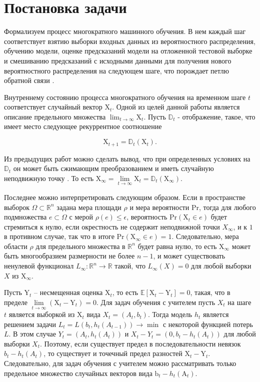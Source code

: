 \section{Постановка задачи} \label{sec:Problem_statement}

Формализуем процесс многократного машинного обучения. В нем каждый шаг соответствует взятию выборки входных данных из вероятностного распределения, обучению модели, оценке предсказаний модели на отложенной тестовой выборке и смешиванию предсказаний с исходными данными для получения нового вероятностного распределения на следующем шаге, что порождает петлю обратной связи \cite{khritankov2021existence}.

Внутреннему состоянию процесса многократного обучения на временном шаге $t$ соответствует случайный вектор $\text{X}_t$. Одной из целей данной работы является описание предельного множества $\lim_{t \to \infty} \text{X}_t$. Пусть $\mathbb{D}_t$ - отображение, такое, что имеет место следующее рекуррентное соотношение

\[
    \text{X}_{t+1} = \mathbb{D}_t (\text{X}_t).
\]

Из предыдущих работ \cite{khritankov2021hidden, khritankov2023positive} можно сделать вывод, что при определенных условиях на $\mathbb{D}_t$ он может быть сжимающим преобразованием и иметь случайную неподвижную точку \citep{itoh1977random}. То есть $\text{X}_{\infty} = \lim\limits_{t \to \infty} \text{X}_{t} = \mathbb{D}_t (\text{X}_{\infty})$. 

Последнее можно интерпретировать следующим образом. Если в пространстве выборок $\Omega \subset \mathbb{R}^n$ задана мера площади $\rho$ и мера вероятности $\text{Pr}$, тогда для любого подмножества $e \subset \Omega$ с мерой $\rho(e)\leq \epsilon$, вероятность $\text{Pr}(\text{X}_t \in e)$ будет стремиться к нулю, если окрестность не содержит неподвижной точки $X_{\infty}$, и к $1$ в противном случае, так что в итоге $\text{Pr}(\text{X}_{\infty} \in e) = 1$. Следовательно, мера области $\rho$ для предельного множества в $\mathbb{R}^n$ будет равна нулю, то есть $\text{X}_{\infty}$ может быть многообразием размерности не более $n-1$, и может существовать ненулевой функционал $L_{\infty}: \mathbb{R}^n \to \mathbb{R}$ такой, что $L_{\infty}(X) = 0$ для любой выборки $X$ из $\text{X}_\infty$.

Пусть $\text{Y}_t$ -- несмещенная оценка $\text{X}_t$, то есть $\mathbb{E}\left[\text{X}_t - \text{Y}_t\right] = 0$, такая, что в пределе $\lim\limits_{t \to \infty} \left(\text{X}_t - \text{Y}_t \right) = 0$.  Для задач обучения с учителем пусть $X_t$ на шаге $t$ является выборкой из $\text{X}_t$ вида $X_t = (A_t, b_t)$. Тогда модель $h_t$ является решением задачи $L_t = L(b_t, h_t(A_{t-1})) \to \min$ с некоторой функцией потерь $L$. В этом случае $Y_t = (A_t, h_t(A_t))$ и $X_t - Y_t = (0, b_t - h_t(A_{t}))$ для любой выборки $X_t$. Поэтому, если существует предел в последовательности невязок $b_t - h_t(A_t)$, то существует и точечный предел разностей $\text{X}_t - \text{Y}_t$. Следовательно, для задач обучения с учителем можно рассматривать только предельное множество случайных векторов вида $\text{b}_t - h_t(\text{A}_t)$.

